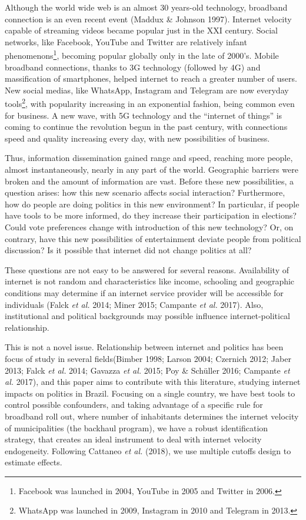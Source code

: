 \documentclass[
  12pt,
]{article}
\begin{document}
Although the world wide web is an almost 30 years-old technology,
broadband connection is an even recent event (Maddux \& Johnson 1997).
Internet velocity capable of streaming videos became popular just in the
XXI century. Social networks, like Facebook, YouTube and Twitter are
relatively infant phenomenons\footnote{Facebook was launched in 2004,
  YouTube in 2005 and Twitter in 2006.}, becoming popular globally only
in the late of 2000's. Mobile broadband connections, thanks to 3G
technology (followed by 4G) and massification of smartphones, helped
internet to reach a greater number of users. New social medias, like
WhatsApp, Instagram and Telegram are now everyday tools\footnote{WhatsApp
  was launched in 2009, Instagram in 2010 and Telegram in 2013.}, with
popularity increasing in an exponential fashion, being common even for
business. A new wave, with 5G technology and the ``internet of things''
is coming to continue the revolution begun in the past century, with
connections speed and quality increasing every day, with new
possibilities of business.

Thus, information dissemination gained range and speed, reaching more
people, almost instantaneously, nearly in any part of the world.
Geographic barriers were broken and the amount of information are vast.
Before these new possibilities, a question arises: how this new scenario
affects social interaction? Furthermore, how do people are doing
politics in this new environment? In particular, if people have tools to
be more informed, do they increase their participation in elections?
Could vote preferences change with introduction of this new technology?
Or, on contrary, have this new possibilities of entertainment deviate
people from political discussion? Is it possible that internet did not
change politics at all?

These questions are not easy to be answered for several reasons.
Availability of internet is not random and characteristics like income,
schooling and geographic conditions may determine if an internet service
provider will be accessible for individuals (Falck \emph{et al.} 2014;
Miner 2015; Campante \emph{et al.} 2017). Also, institutional and
political backgrounds may possible influence internet-political
relationship.

This is not a novel issue. Relationship between internet and politics
has been focus of study in several fields(Bimber 1998; Larson 2004;
Czernich 2012; Jaber 2013; Falck \emph{et al.} 2014; Gavazza \emph{et
al.} 2015; Poy \& Schüller 2016; Campante \emph{et al.} 2017), and this
paper aims to contribute with this literature, studying internet impacts
on politics in Brazil. Focusing on a single country, we have best tools
to control possible confounders, and taking advantage of a specific rule
for broadband roll out, where number of inhabitants determines the
internet velocity of municipalities (the backhaul program), we have a
robust identification strategy, that creates an ideal instrument to deal
with internet velocity endogeneity. Following Cattaneo \emph{et al.}
(2018), we use multiple cutoffs design to estimate effects.
\end{document}
